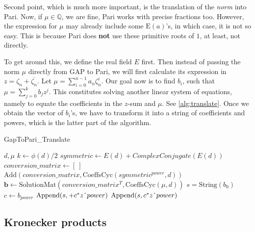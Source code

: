 \documentclass[11pt]{article}
\begin{document}
Second point, which is much more important, is the translation of the \textit{norm}
into Pari. Now, if $\mu \in \mathbb{Q}$, we are fine, Pari works with precise
fractions too. However, the expression for $\mu$ may already include some
$\text{E}(a)$'s, in which case, it is not so easy. This is because Pari does
\textbf{not} use these primitive roots of $1$, at least, not directly.

To get around this, we define the real field $E$ first. Then instead of passing the
norm $\mu$ directly from GAP to Pari, we will first calculate its expression in
$z = \zeta_n + \overline{\zeta_n}$. Let $\mu = \sum_{i = 0}^{n-1} a_n \zeta_n^i$.
Our goal now is to find $b_i$, such that $\mu = \sum_{j = 0}^{k} b_j z^j$.
This constitutes solving another linear system of equations, namely to equate the
coefficients in the $z$-sum and $\mu$. See \cref{alg:translate}. Once we obtain
the vector of $b_i$'s, we have to transform it into a string of coefficients and
powers, which is the latter part of the algorithm.

\begin{algorithm}
  \caption{GapToPari\_Translate}
  \label{alg:translate}
  \begin{algorithmic}
    \State $d, \mu$
    \State $k \gets \phi(d) / 2$ 
    \State $symmetric \gets E(d) + ComplexConjugate(E(d))$
    \State $conversion\_matrix \gets [~]$
      \State $\text{Add}(conversion\_matrix, \text{CoeffsCyc}(symmetric^{power}, d))$
    \EndFor
    \State $\mathbf{b} \gets \text{SolutionMat}(conversion\_matrix^T, \text{CoeffsCyc}(\mu, d))$
    \State $s = \text{String}(b_0)$
      \State $c \gets b_{power}$
        \State $\text{Append}(s, +c^*z \string^ power)$
        \State $\text{Append}(s, c^*z \string^ power)$ 
      \EndIf
    \EndFor
  \end{algorithmic}
\end{algorithm}

\subsection{Kronecker products} \label{sec:kronecker}
\end{document}
